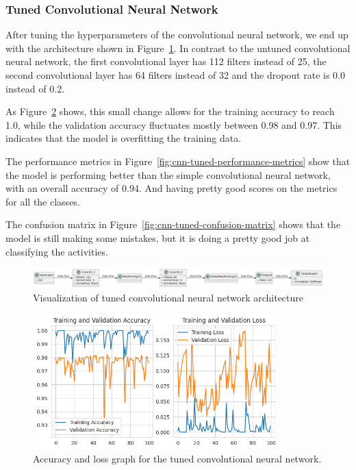 \subsubsection{Tuned Convolutional Neural Network}

After tuning the hyperparameters of the convolutional neural network,
we end up with the architecture shown in Figure~\ref{fig:cnn-best-params}.
In contrast to the untuned convolutional neural network, the first convolutional layer has 112 filters instead of 25, the second convolutional layer has 64 filters instead of 32 and the dropout rate is 0.0 instead of 0.2.

As Figure~\ref{fig:cnn-tuned-accuracy-loss-graph} shows, this small change allows for the training accuracy to reach 1.0, while the validation accuracy fluctuates mostly between 0.98 and 0.97.
This indicates that the model is overfitting the training data.

The performance metrics in Figure~\ref{fig:cnn-tuned-performance-metrics} show that the model is performing better than the simple convolutional neural network, with an overall accuracy of 0.94.
And having pretty good scores on the metrics for all the classes.

The confusion matrix in Figure~\ref{fig:cnn-tuned-confusion-matrix} shows that the model is still making some mistakes, but it is doing a pretty good job at classifying the activities.

\begin{figure}[ht]
    \centering
    \includegraphics[width=\textwidth]{./img/cnn/tuned/cnn-best-params}
    \caption{Visualization of tuned convolutional neural network architecture}
    \label{fig:cnn-best-params}
\end{figure}

\begin{figure}[ht]
    \centering
    \includegraphics[width=0.85\textwidth]{./img/cnn/tuned/accuracy-loss-graph}
    \caption{Accuracy and loss graph for the tuned convolutional neural network.}
    \label{fig:cnn-tuned-accuracy-loss-graph}
\end{figure}

